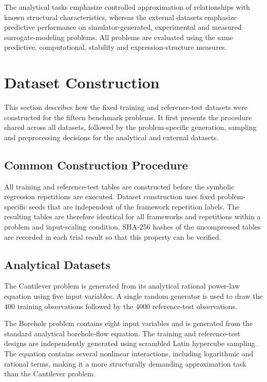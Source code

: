 \documentclass[12pt,oneside,bibtotoc,liststotoc]{scrbook}
\begin{document}
The analytical tasks emphasize controlled approximation of relationships with known structural characteristics, whereas the external datasets emphasize predictive performance on simulator-generated, experimental and measured surrogate-modeling problems. All problems are evaluated using the same predictive, computational, stability and expression-structure measures.

\section{Dataset Construction}

This section describes how the fixed training and reference-test datasets were constructed for the fifteen benchmark problems. It first presents the procedure shared across all datasets, followed by the problem-specific generation, sampling and preprocessing decisions for the analytical and external datasets.

\subsection{Common Construction Procedure}

All training and reference-test tables are constructed before the symbolic regression repetitions are executed. Dataset construction uses fixed problem-specific seeds that are independent of the framework repetition labels. The resulting tables are therefore identical for all frameworks and repetitions within a problem and input-scaling condition. SHA-256 hashes of the uncompressed tables are recorded in each trial result so that this property can be verified.

\subsection{Analytical Datasets}

The Cantilever problem is generated from its analytical rational power-law equation using five input variables. A single random generator is used to draw the 400 training observations followed by the 4000 reference-test observations.

The Borehole problem contains eight input variables and is generated from the standard analytical borehole-flow equation. The training and reference-test designs are independently generated using scrambled Latin hypercube sampling. The equation contains several nonlinear interactions, including logarithmic and rational terms, making it a more structurally demanding approximation task than the Cantilever problem.
\end{document}
